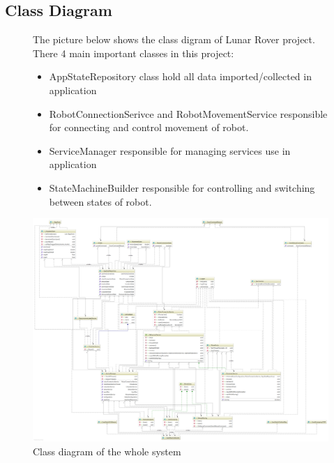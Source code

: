\subsection{Class Diagram}
\begin{figure}[H]
	The picture below shows the class digram of Lunar Rover project. There 4 main important classes in this project:
	\begin{itemize}
		\item AppStateRepository class hold all data imported/collected in application
		\item RobotConnectionSerivce and RobotMovementService responsible for connecting and control movement of robot.
		\item ServiceManager responsible for managing services use in application
		\item StateMachineBuilder responsible for controlling and switching between states of robot.
	\end{itemize}
	\centering
	\hspace*{-25mm}
	\includegraphics[width=1.4\textwidth]{ClassDiagram.png}	
	\caption{\label{fig:diagramClasses}Class diagram of the whole system}
\end{figure}	

